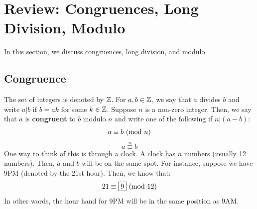 \documentclass[letterpaper]{article}
\begin{document}
\newpage 
\section{Review: Congruences, Long Division, Modulo}
In this section, we discuss congruences, long division, and modulo. 

\subsection{Congruence}
The set of integers is denoted by $\mathbb{Z}$. For $a, b \in \mathbb{Z}$, we say that $a$ divides $b$ and write $a | b$ if $b = ak$ for some $k \in \mathbb{Z}$. Suppose $n$ is a non-zero integer. Then, we say that $a$ is \textbf{congruent} to $b$ modulo $n$ and write one of the following if $n | (a - b)$:
\[a \equiv b \ (\mathrm{mod}\ n)\]
\[a \overset{n}{\equiv} b\]
One way to think of this is through a clock. A clock has $n$ numbers (usually 12 numbers). Then, $a$ and $b$ will be on the same spot. For instance, suppose we have 9PM (denoted by the 21st hour). Then, we know that:
\[21 \equiv \boxed{9} \ (\mathrm{mod}\ 12)\]
In other words, the hour hand for 9PM will be in the same position as 9AM. 
\end{document}

